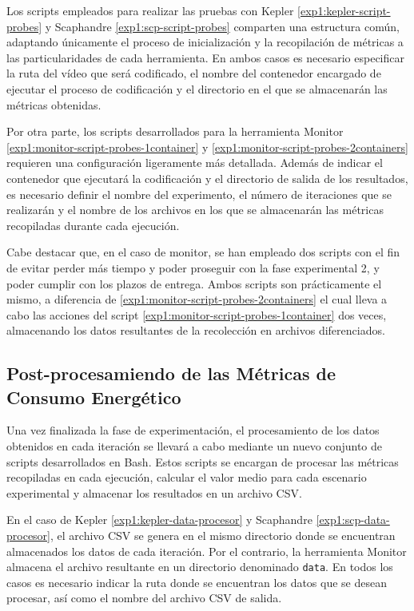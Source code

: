  Los scripts empleados para realizar las pruebas con Kepler \ref{exp1:kepler-script-probes} y Scaphandre \ref{exp1:scp-script-probes} comparten una estructura común, adaptando únicamente el proceso de inicialización y la recopilación de métricas a las particularidades de cada herramienta. En ambos casos es necesario especificar la ruta del vídeo que será codificado, el nombre del contenedor encargado de ejecutar el proceso de codificación y el directorio en el que se almacenarán las métricas obtenidas.
 
 Por otra parte, los scripts desarrollados para la herramienta Monitor \ref{exp1:monitor-script-probes-1container} y \ref{exp1:monitor-script-probes-2containers} requieren una configuración ligeramente más detallada. Además de indicar el contenedor que ejecutará la codificación y el directorio de salida de los resultados, es necesario definir el nombre del experimento, el número de iteraciones que se realizarán y el nombre de los archivos en los que se almacenarán las métricas recopiladas durante cada ejecución.
 
 Cabe destacar que, en el caso de monitor, se han empleado dos scripts con el fin de evitar perder más tiempo y poder proseguir con la fase experimental 2, y poder cumplir con los plazos de entrega. Ambos scripts son prácticamente el mismo, a diferencia de \ref{exp1:monitor-script-probes-2containers} el cual lleva a cabo las acciones del script \ref{exp1:monitor-script-probes-1container} dos veces, almacenando los datos resultantes de la recolección en archivos diferenciados.


\subsection{Post-procesamiendo de las Métricas de Consumo Energético}
 Una vez finalizada la fase de experimentación, el procesamiento de los datos obtenidos en cada iteración se llevará a cabo mediante un nuevo conjunto de scripts desarrollados en Bash. Estos scripts se encargan de procesar las métricas recopiladas en cada ejecución, calcular el valor medio para cada escenario experimental y almacenar los resultados en un archivo CSV.
 
 En el caso de Kepler \ref{exp1:kepler-data-procesor} y Scaphandre \ref{exp1:scp-data-procesor}, el archivo CSV se genera en el mismo directorio donde se encuentran almacenados los datos de cada iteración. Por el contrario, la herramienta Monitor almacena el archivo resultante en un directorio denominado \texttt{data}. En todos los casos es necesario indicar la ruta donde se encuentran los datos que se desean procesar, así como el nombre del archivo CSV de salida.
 
